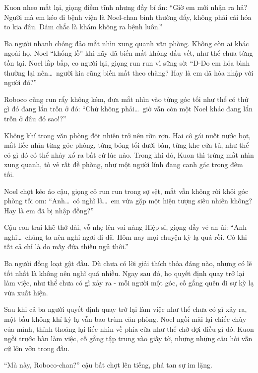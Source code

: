 \documentclass[../main.tex]{subfiles}
\begin{document}
Kuon nheo mắt lại, giọng điềm tĩnh nhưng đầy bí ẩn: ``Giờ em mới nhận ra hả? Người mà em kéo đi bệnh viện là Noel-chan bình thường đấy, không phải cái hóa to kia đâu. Dám chắc là khám không ra bệnh luôn.''

Ba người nhanh chóng đảo mắt nhìn xung quanh văn phòng. Không còn ai khác ngoài họ. Noel ``khổng lồ'' khi nãy đã biến mất không dấu vết, như thể chưa từng tồn tại. Noel lắp bắp, co người lại, giọng run run vì sững sờ: ``D-Do em hóa bình thường lại nên\dots\ người kia cũng biến mất theo chăng? Hay là em đã hòa nhập với người đó?''

Roboco cũng run rẩy không kém, đưa mắt nhìn vào từng góc tối như thể có thứ gì đó đang lẩn trốn ở đó: ``Chứ không phải\dots\ giờ vẫn còn một Noel khác đang lẩn trốn ở đâu đó sao!?''

Không khí trong văn phòng đột nhiên trở nên rờn rợn. Hai cô gái nuốt nước bọt, mắt liếc nhìn từng góc phòng, từng bóng tối dưới bàn, từng khe cửa tủ, như thể có gì đó có thể nhảy xổ ra bất cứ lúc nào. Trong khi đó, Kuon thì trừng mắt nhìn xung quanh, tỏ vẻ rất đề phòng, như một người lính đang canh gác trong đêm tối.

Noel chợt kéo áo cậu, giọng cô run run trong sợ sệt, mắt vẫn không rời khỏi góc phòng tối om: ``Anh\dots\ có nghĩ là\dots\ em vừa gặp một hiện tượng siêu nhiên không? Hay là em đã bị nhập đồng?''

Cậu con trai khẽ thở dài, vỗ nhẹ lên vai nàng Hiệp sĩ, giọng đầy vẻ an ủi: ``Anh nghĩ\dots\ chúng ta nên nghỉ ngơi đi đã. Hôm nay mọi chuyện kỳ lạ quá rồi. Có khi tất cả chỉ là do mấy đứa thiếu ngủ thôi.''

Ba người đồng loạt gật đầu. Dù chưa có lời giải thích thỏa đáng nào, nhưng có lẽ tốt nhất là không nên nghĩ quá nhiều. Ngay sau đó, họ quyết định quay trở lại làm việc, như thể chưa có gì xảy ra - mỗi người một góc, cố gắng quên đi sự kỳ lạ vừa xuất hiện.

\omk

Sau khi cả ba người quyết định quay trở lại làm việc như thể chưa có gì xảy ra, một bầu không khí kỳ lạ vẫn bao trùm căn phòng. Noel ngồi mài lại chiếc chùy của mình, thỉnh thoảng lại liếc nhìn về phía cửa như thể chờ đợi điều gì đó. Kuon ngồi trước bàn làm việc, cố gắng tập trung vào giấy tờ, nhưng những câu hỏi vẫn cứ lởn vởn trong đầu.

``Mà này, Roboco-chan?'' cậu bất chợt lên tiếng, phá tan sự im lặng.
\end{document}
